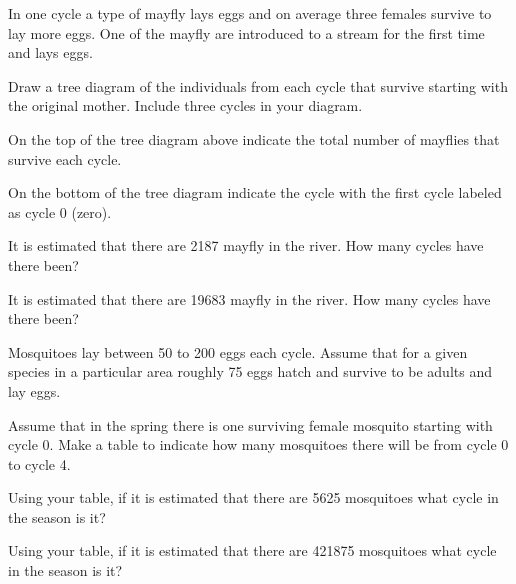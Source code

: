\begin{problem}
\clearpage

\item In one cycle a type of mayfly lays eggs and on average three
  females survive to lay more eggs. One of the mayfly are introduced
  to a stream for the first time and lays eggs.
  \begin{subproblem}
  \item Draw a tree diagram of the individuals from each cycle that
    survive starting with the original mother. Include three cycles in
    your diagram.
    \vfill
  \item On the top of the tree diagram above indicate the total number
    of mayflies that survive each cycle.
  \item On the bottom of the tree diagram indicate the cycle with the
    first cycle labeled as cycle 0 (zero).
  \item It is estimated that there are 2187 mayfly in the river. How
    many cycles have there been?
    \vspace{3em}
  \item It is estimated that there are 19683 mayfly in the river. How
    many cycles have there been?
    \vspace{3em}
  \end{subproblem}

\clearpage

\item Mosquitoes lay between 50 to 200 eggs each cycle. Assume that
  for a given species in a particular area roughly 75 eggs hatch and
  survive to be adults and lay eggs.
  \begin{subproblem}
  \item Assume that in the spring there is one surviving female
    mosquito starting with cycle 0. Make a table to indicate how many
    mosquitoes there will be from cycle 0 to cycle 4.
    \vfill
  \item Using your table, if it is estimated that there are 5625
    mosquitoes what cycle in the season is it?
    \vfill
  \item Using your table, if it is estimated that there are 421875
    mosquitoes what cycle in the season is it?
    \vfill
  \end{subproblem}

\end{problem}

\postClass

